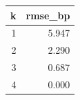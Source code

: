 
\begin{tabular}{rr}
\toprule
k & rmse\_bp\\
\midrule
1 & 5.947\\
2 & 2.290\\
3 & 0.687\\
4 & 0.000\\
\bottomrule
\end{tabular}

